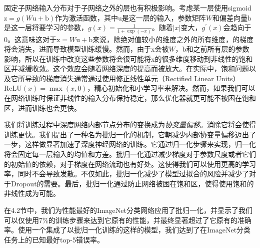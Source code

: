 \documentclass[../main.tex]{subfile}
\begin{document}
固定子网络输入分布对于子网络之外的层也有积极影响。考虑某一层使用sigmoid$\text{z} = g(W\text{u} + \text{b})$作为激活函数，其中$\text{u}$是这一层的输入，参数矩阵$W$和偏差向量$\text{b}$是这一层将要学习的参数，$g(x) = \frac{1}{1 + \exp(-x)}$。随着$|x|$变大，$g^\prime (x)$会趋向于0。这意味这对于$\text{x}=W\text{u} + \text{b}$来说，除绝对值较小的维度之外的所有维度，的梯度将会消失，进而导致模型训练缓慢。然而，由于x会被$W$，b和之前所有层的参数影响，所以在训练中改变这些参数将会很可能将x的很多维度移动到非线性的饱和区并减缓收敛。这个效应会随着网络深度的提高而被放大。在实际中，饱和问题以及它所导致的梯度消失通常通过使用修正线性单元（Rectified Linear Units）\cite{relu}$\text{ReLU}(x)=\max(x, 0)$，精心初始化和小学习率来解决。然而，如果我们可以在网络训练时保证非线性的输入分布保持稳定，那么优化器就更可能不被困在饱和区，进而训练也会更快。

我们将训练过程中深度网络内部节点分布的变换成为\textit{协变量偏移}。消除它将会使得训练更快。我们提出了一种名为批归一化的机制，它朝减少内部协变量偏移迈出了一步，这样做显著加速了深度神经网络的训练。它通过归一化步骤来实现，归一化将会固定每一层输入的均值和方差。批归一化通过减少梯度对于参数尺度或者它们的初始值的依赖，对于梯度在网络流动也有好处。这使得我们可以使用更高的学习率，同时不会导致发散。不仅如此，批归一化减少了模型过拟合的风险并减少了对于Dropout\cite{dropout}的需要。最后，批归一化通过防止网络被困在饱和区，使得使用饱和的非线性成为可能。

在4.2节中，我们为性能最好的ImageNet分类网络应用了批归一化，并显示了我们可以仅使用7\%的训练步骤来达到它原有的性能，并最终显著超过了它原有的准确率。使用一个集成了以批归一化训练的这样的模型，我们达到了在ImageNet分类任务上的已知最好top-5错误率。
\end{document}
